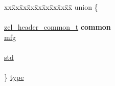 \begin{DoxyCompactItemize}
\begin{tabbing}
xx\=xx\=xx\=xx\=xx\=xx\=xx\=xx\=xx\=\kill
union \{\\
\\
\>\hyperlink{group__zcl_gaece1b64b04ac629f83358d6d815451a5}{zcl\_header\_common\_t} {\bfseries common}\\
\>\hyperlink{group__zcl_gacef7f7e36d411b8000d1ac172c5e8782}{mfg}\\
\>\\
\>\hyperlink{group__zcl_ga36fda9bc88c532ecc94200bcd756b1d3}{std}\\
\>\\
\} \hyperlink{group__zcl_ga1d127017fb298b889f4ba24752d08b8e}{type}\\


\end{tabbing}
\end{DoxyCompactItemize}
